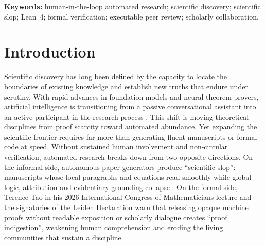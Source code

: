 \documentclass[11pt,a4paper]{article}
\begin{document}
\begin{titlepage}
\begin{abstract}
Gemini; 90 evaluations; Kendall concordance $W=0.828$), collaborative preprints
rank highest under every judge, outperforming autonomous AI-only studies in 260
of 300 cross-cohort comparisons (exact permutation $p=0.0012$, $0.0149$ and
$3.2\times10^{-5}$), matching sound human-only arXiv preprints with 2.3- to
4.2-fold narrower overall dispersion and carrying formal or certified checks in
all ten papers versus one of ten human preprints and none of ten autonomous
studies. A controlled ablation over 20 real mathematical claims shows that
enforcing an executable counterexample witness eliminates false-positive
``review slop'' while retaining high flaw recall, and an audit of 24,925 public
formal-gate contributions documents systematic pre-admission rejection and
multi-commit repair. Together with 17 collaborative arXiv preprints (16 with
external coauthors), 177 proof-checking scholars and an instrumented 33-hour
research trace, these results show how human-guided, verification-centered
automation can expand the frontier of rigorous scientific knowledge.
\end{abstract}
\vspace{0.5em}
\noindent\textbf{Keywords:} human-in-the-loop automated research; scientific
discovery; scientific slop; Lean~4; formal verification; executable peer
review; scholarly collaboration.
\end{titlepage}
\setcounter{page}{2}

\section{Introduction}
Scientific discovery has long been defined by the capacity to locate the
boundaries of existing knowledge and establish new truths that endure under
scrutiny. With rapid advances in foundation models and neural theorem provers,
artificial intelligence is transitioning from a passive conversational
assistant into an active participant in the research process
\citep{tao2026age,scientisttwo}. This shift is moving theoretical disciplines
from proof scarcity toward automated abundance. Yet expanding the scientific
frontier requires far more than generating fluent manuscripts or formal code at
speed. Without sustained human involvement and non-circular verification,
automated research breaks down from two opposite directions. On the informal
side, autonomous paper generators produce ``scientific slop'': manuscripts
whose local paragraphs and equations read smoothly while global logic,
attribution and evidentiary grounding collapse \citep{oh2026slop,societyai}. On
the formal side, Terence Tao in his 2026 International Congress of
Mathematicians lecture and the signatories of the Leiden Declaration warn that
releasing opaque machine proofs without readable exposition or scholarly
dialogue creates ``proof indigestion'', weakening human comprehension and
eroding the living communities that sustain a discipline
\citep{tao2026age,leiden2026}.
\end{document}
